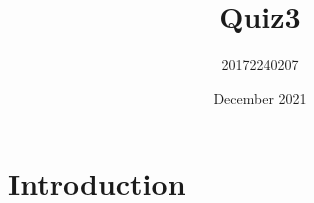 \documentclass{article}
\title{Quiz3}
\author{20172240207 }
\date{December 2021}
\begin{document}
\maketitle

\section{Introduction}
\end{document}
